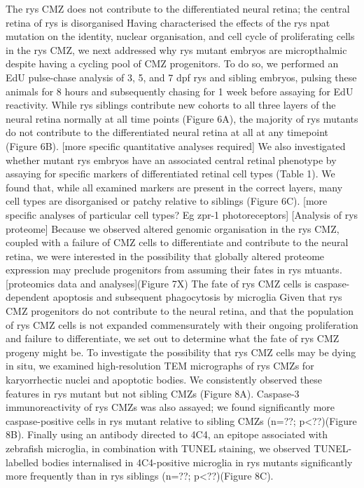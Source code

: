 The rys CMZ does not contribute to the differentiated neural retina; the central retina of rys is disorganised
Having characterised the effects of the rys npat mutation on the identity, nuclear organisation, and cell cycle of proliferating cells in the rys CMZ, we next addressed why rys mutant embryos are micropthalmic despite having a cycling pool of CMZ progenitors. To do so, we performed an EdU pulse-chase analysis of 3, 5, and 7 dpf rys and sibling embryos, pulsing these animals for 8 hours and subsequently chasing for 1 week before assaying for EdU reactivity. While rys siblings contribute new cohorts to all three layers of the neural retina normally at all time points (Figure 6A), the majority of rys mutants do not contribute to the differentiated neural retina at all at any timepoint (Figure 6B). [more specific quantitative analyses required] We also investigated whether mutant rys embryos have an associated central retinal phenotype by assaying for specific markers of differentiated retinal cell types (Table 1). We found that, while all examined markers are present in the correct layers, many cell types are disorganised or patchy relative to siblings (Figure 6C). [more specific analyses of particular cell types? Eg zpr-1 photoreceptors] 
[Analysis of rys proteome]
Because we observed altered genomic organisation in the rys CMZ, coupled with a failure of CMZ cells to differentiate and contribute to the neural retina, we were interested in the possibility that globally altered proteome expression may preclude progenitors from assuming their fates in rys mtuants. [proteomics data and analyses](Figure 7X)
The fate of rys CMZ cells is caspase-dependent apoptosis and subsequent phagocytosis by microglia
Given that rys CMZ progenitors do not contribute to the neural retina, and that the population of rys CMZ cells is not expanded commensurately with their ongoing proliferation and failure to differentiate, we set out to determine what the fate of rys CMZ progeny might be. To investigate the possibility that rys CMZ cells may be dying in situ, we examined high-resolution TEM micrographs of rys CMZs for karyorrhectic nuclei and apoptotic bodies. We consistently observed these features in rys mutant but not sibling CMZs (Figure 8A). Caspase-3 immunoreactivity of rys CMZs was also assayed; we found significantly more caspase-positive cells in rys mutant relative to sibling CMZs (n=??; p<??)(Figure 8B). Finally using an antibody directed to 4C4, an epitope associated with zebrafish microglia, in combination with TUNEL staining, we observed TUNEL-labelled bodies internalised in 4C4-positive microglia in rys mutants significantly more frequently than in rys siblings (n=??; p<??)(Figure 8C).
